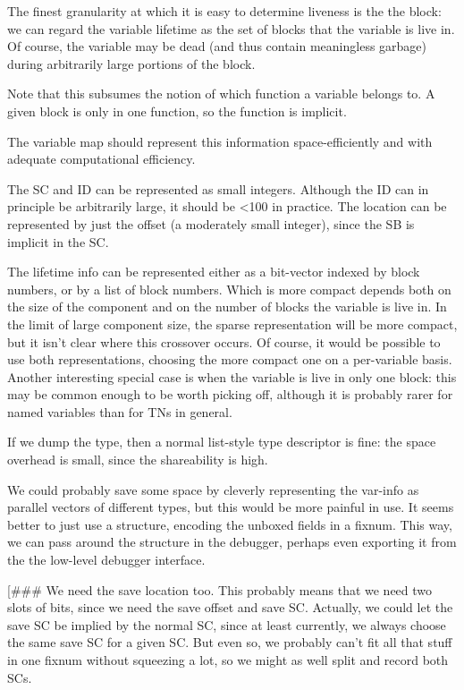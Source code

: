 	The finest granularity at which it is easy to determine liveness is the
	the block: we can regard the variable lifetime as the set of blocks
	that the variable is live in.  Of course, the variable may be dead (and
	thus contain meaningless garbage) during arbitrarily large portions of
	the block.

	Note that this subsumes the notion of which function a variable belongs
	to.  A given block is only in one function, so the function is
	implicit.


The variable map should represent this information space-efficiently and with
adequate computational efficiency.

The SC and ID can be represented as small integers.  Although the ID can in
principle be arbitrarily large, it should be <100 in practice.  The location
can be represented by just the offset (a moderately small integer), since the
SB is implicit in the SC.

The lifetime info can be represented either as a bit-vector indexed by block
numbers, or by a list of block numbers.  Which is more compact depends both on
the size of the component and on the number of blocks the variable is live in.
In the limit of large component size, the sparse representation will be more
compact, but it isn't clear where this crossover occurs.  Of course, it would
be possible to use both representations, choosing the more compact one on a
per-variable basis.  Another interesting special case is when the variable is
live in only one block: this may be common enough to be worth picking off,
although it is probably rarer for named variables than for TNs in general.

If we dump the type, then a normal list-style type descriptor is fine: the
space overhead is small, since the shareability is high.

We could probably save some space by cleverly representing the var-info as
parallel vectors of different types, but this would be more painful in use.
It seems better to just use a structure, encoding the unboxed fields in a
fixnum.  This way, we can pass around the structure in the debugger, perhaps
even exporting it from the the low-level debugger interface.

[\#\#\# We need the save location too.  This probably means that we need two slots
of bits, since we need the save offset and save SC.  Actually, we could let the
save SC be implied by the normal SC, since at least currently, we always choose
the same save SC for a given SC.  But even so, we probably can't fit all that
stuff in one fixnum without squeezing a lot, so we might as well split and
record both SCs.

